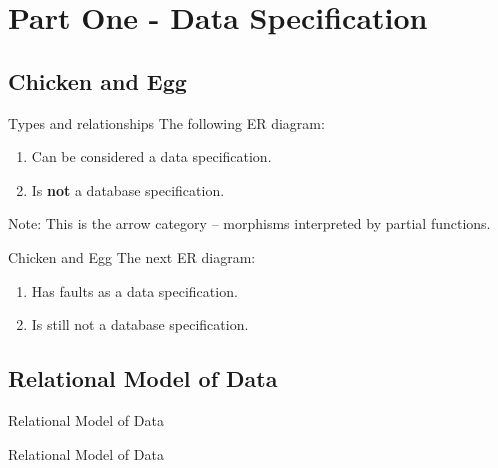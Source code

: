 \documentclass{beamer}
\renewcommand{\erpictureFolder}[0]{../SharedPictures}
\begin{document}
\section{Part One - Data Specification}


\subsection{Chicken and Egg}
\begin{frame}{Types and relationships}
The following ER diagram:
\begin{center}
\scalebox{0.9}{

}
\end{center}
\begin{center}
\begin{enumerate}
\item Can be considered a data specification.
\item Is \textbf{not} a database specification. 
\end{enumerate}
\end{center}
Note: This is the arrow category -- morphisms interpreted by partial functions. 
\end{frame}
\begin{frame}{Chicken and Egg}
The next ER diagram:
\begin{center}
\scalebox{0.9}{

}
\end{center}
\begin{center}
\begin{enumerate}
\item Has faults as a data specification.
\item Is still not a database specification. 
\end{enumerate}
\end{center}
\end{frame}


\subsection{Relational Model of Data}
\begin{frame}{Relational Model of Data}
\scalebox{0.6}{

}
\end{frame}
\begin{frame}{Relational Model of Data}
\scalebox{0.6}{

}
\end{frame}
\end{document}
